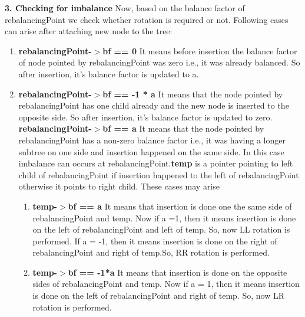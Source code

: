 \documentclass[12pt]{article}
\begin{document}
\begin{enumerate}
        \textbf{3. Checking for imbalance}\newline
        Now, based on the balance factor of rebalancingPoint we check whether rotation is required or not. 
        Following cases can arise after attaching new node to the tree:
        \begin{enumerate} [label=\roman*]
            \item \textbf{rebalancingPoint-$>$bf == 0}\newline
            It means before insertion the balance factor of node pointed by rebalancingPoint was zero i.e., it was already balanced. So after insertion, it’s balance factor is updated to a.
            \item \textbf{rebalancingPoint-$>$bf == -1 * a}\newline
            It means that the node pointed by rebalancingPoint has one child already and the new node is inserted to the opposite side. So after insertion, it’s balance factor is updated to zero.
            \textbf{rebalancingPoint-$>$bf == a}\newline
            It means that the node pointed by rebalancingPoint has a non-zero balance factor i.e., it was having a longer subtree on one side and insertion happened on the same side. In this case imbalance can occurs at rebalancingPoint.\textbf{temp} is a pointer pointing to left child of rebalancingPoint if insertion happened to the left of rebalancingPoint otherwise it points to right child. These cases may arise
            \begin{enumerate} [label=\roman*]
                \item \textbf{temp-$>$bf == a}\newline
                It means that insertion is done one the same side of rebalancingPoint and temp. \newline
                Now if a =1, then it means insertion is done on the left of rebalancingPoint and left of temp. So, now LL rotation is performed. \newline 
                If a = -1, then it means insertion is done on the right of rebalancingPoint and right of temp.So, RR rotation is performed.
                \item \textbf{temp-$>$bf == -1*a} \newline
                It means that insertion is done on the opposite sides of rebalancingPoint and temp.\newline
		        Now if a = 1, then it means insertion is done on the left of rebalancingPoint and right of temp. So, now LR rotation is performed. \newline

\end{enumerate}
\end{enumerate}
\end{enumerate}
\end{document}
